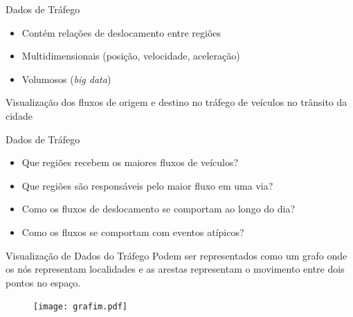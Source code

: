 
\begin{frame}{Dados de Tráfego}
  \begin{itemize}
    \item Contém relações de deslocamento entre regiões
    \item Multidimensionais (posição, velocidade, aceleração)
    \item Volumosos (\emph{big data})
  \end{itemize}
\end{frame}


\begin{frame}[standout]
  Visualização dos fluxos de origem e destino no tráfego de veículos no
trânsito da cidade
\end{frame}

\begin{frame}{Dados de Tráfego}
  \begin{itemize}
    \item Que regiões recebem os maiores fluxos de veículos?
    \item Que regiões são responsáveis pelo maior fluxo em uma via?
    \item Como os fluxos de deslocamento se comportam ao longo do dia?
    \item Como os fluxos se comportam com eventos atípicos?
  \end{itemize}
\end{frame}

{
\begin{frame}{Visualização de Dados do Tráfego}
  Podem ser representados como um grafo onde os nós representam localidades e
as arestas representam o movimento entre dois pontos no espaço.

  \begin{figure}[!htb]
    \centering
    \texttt{[image: grafim.pdf]}
  \end{figure}
\end{frame}
}

